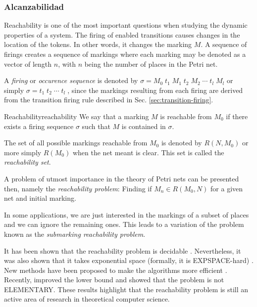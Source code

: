 \subsubsection{Alcanzabilidad}
\label{sec:reachability}

Reachability is one of the most important questions
when studying the dynamic properties of a system.
The firing of enabled transitions causes changes in the location of the tokens.
In other words, it changes the marking $M$.
A sequence of firings creates a sequence of markings
where each marking may be denoted as a vector of length $n$,
with $n$ being the number of places in the Petri net.

A \emph{firing} or \emph{occurence sequence} is denoted by
$ \sigma = M_0\; t_1\; M_1\; t_2\; M_2\; \cdots\; t_l\; M_l$ or simply
$ \sigma = t_1\; t_2\; \cdots\; t_l\; $, since the markings
resulting from each firing are derived
from the transition firing rule described in Sec. \ref{sec:transition-firing}.

\begin{definition}{Reachability}{reachability}
      We say that a marking $M$ is reachable from $M_0$
      if there exists a firing sequence $\sigma$ such that $M$ is contained in $\sigma$.
\end{definition}

The set of all possible markings reachable from $M_0$ is denoted by $R(N, M_0)$ or more simply
$R(M_0)$ when the net meant is clear.
This set is called the \emph{reachability set}.

A problem of utmost importance in the theory of Petri nets can be presented then,
namely the \emph{reachability problem}:
Finding if $M_n \in R(M_0, N)$ for a given net and initial marking.

In some applications, we are just interested in the markings of a subset of places
and we can ignore the remaining ones.
This leads to a variation of the problem known as the \emph{submarking reachability problem}.

It has been shown that the reachability problem is decidable \cite{mayr1981}.
Nevertheless, it was also shown that it takes exponential space
(formally, it is EXPSPACE-hard) \cite{lipton1976}.
New methods have been proposed to make the algorithms more efficient \cite{kungas2005petri}.
Recently, \cite{czerwinski2020reachability} improved
the lower bound and showed that the problem is not ELEMENTARY.
These results highlight that the reachability problem is still
an active area of research in theoretical computer science.

